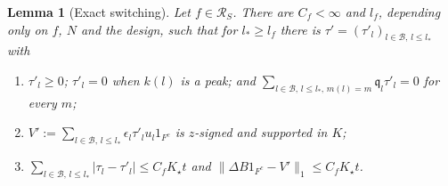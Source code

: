 \documentclass[10pt]{amsart}
\newtheorem{lemma}[theorem]{Lemma}
\theoremstyle{definition}
\theoremstyle{remark}
\begin{document}
\begin{lemma}[Exact switching]\label{lem:exactswitch}
Let $f\in\mathcal R_S$.  There are $C_f<\infty$ and $l_f$, depending only
on $f$, $N$ and the design, such that for $l_*\ge l_f$ there is
$\tau'=(\tau'_l)_{l\in\mathcal B,\,l\le l_*}$ with
\begin{enumerate}
\item[(a)] $\tau'_l\ge0$; $\tau'_l=0$ when $k(l)$ is a peak; and
$\sum_{l\in\mathcal B,\,l\le l_*,\,m(l)=m}\mathfrak q_l\tau'_l=0$ for every
$m$;
\item[(b)] $V':=\sum_{l\in\mathcal B,\,l\le l_*}\epsilon_l\tau'_lu_l1_{F^c}$
is $z$-signed and supported in $K$;
\item[(c)] $\sum_{l\in\mathcal B,\,l\le l_*}|\tau_l-\tau'_l|\le C_fK_\star t$
and $\|\Delta B1_{F^c}-V'\|_1\le C_fK_\star t$.
\end{enumerate}
\end{lemma}
\end{document}
